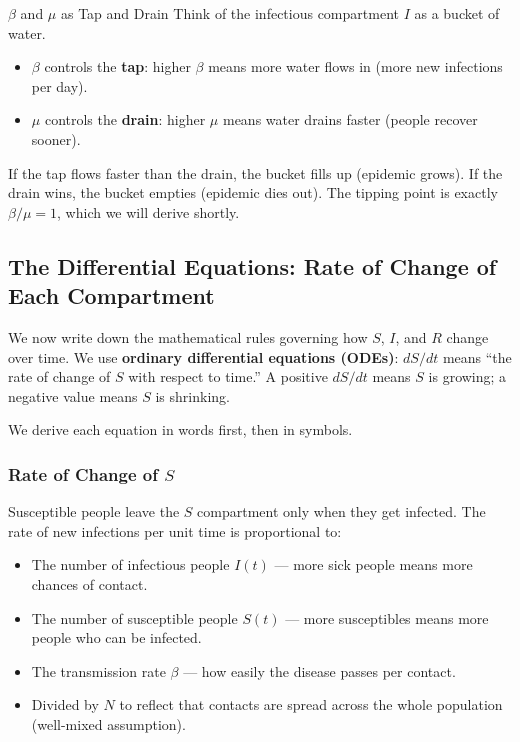 \begin{analogybox}{$\beta$ and $\mu$ as Tap and Drain}
Think of the infectious compartment $I$ as a bucket of water.
\begin{itemize}[noitemsep]
    \item $\beta$ controls the \textbf{tap}: higher $\beta$ means more water flows in (more new infections per day).
    \item $\mu$ controls the \textbf{drain}: higher $\mu$ means water drains faster (people recover sooner).
\end{itemize}
If the tap flows faster than the drain, the bucket fills up (epidemic grows). If the drain wins, the bucket empties (epidemic dies out). The tipping point is exactly $\beta / \mu = 1$, which we will derive shortly.
\end{analogybox}

\subsection{The Differential Equations: Rate of Change of Each Compartment}

We now write down the mathematical rules governing how $S$, $I$, and $R$ change over time. We use \textbf{ordinary differential equations (ODEs)}: $dS/dt$ means ``the rate of change of $S$ with respect to time.'' A positive $dS/dt$ means $S$ is growing; a negative value means $S$ is shrinking.

We derive each equation in words first, then in symbols.

\subsubsection*{Rate of Change of $S$}

Susceptible people leave the $S$ compartment only when they get infected. The rate of new infections per unit time is proportional to:
\begin{itemize}[noitemsep]
    \item The number of infectious people $I(t)$ --- more sick people means more chances of contact.
    \item The number of susceptible people $S(t)$ --- more susceptibles means more people who can be infected.
    \item The transmission rate $\beta$ --- how easily the disease passes per contact.
    \item Divided by $N$ to reflect that contacts are spread across the whole population (well-mixed assumption).
\end{itemize}

